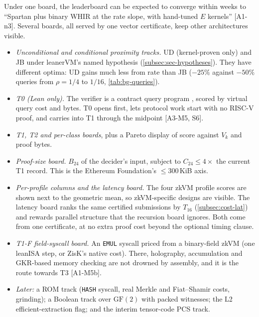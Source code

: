 Under one board, the leaderboard can be expected to converge within weeks to \enquote{Spartan plus
binary WHIR at the rate slope, with hand-tuned $E$ kernels} [A1-n3]. Several boards, all served by one
vector certificate, keep other architectures visible.
\begin{itemize}[nosep]
\item \emph{Unconditional and conditional proximity tracks.} UD (kernel-proven only) and JB under
  leanerVM's named  hypothesis (\cref{subsec:sec-hypotheses}). They have different
  optima: UD gains much less from rate than JB ($-25\%$ against $-50\%$ queries from $\rho=1/4$ to
  $1/16$, \cref{tab:bg-queries}).
\item \emph{T0 (Lean only).} The verifier is a contract query program , scored by virtual
  query cost and bytes. T0 opens first, lets protocol work start with no RISC-V proof, and carries
  into T1 through the  midpoint [A3-M5, S6].
\item \emph{T1, T2 and per-class boards}, plus a Pareto display of score against $V_k$ and proof
  bytes.
\item \emph{Proof-size board.} $B_{24}$ of the decider's input, subject to $C_{24}\le4\times$ the
  current T1 record. This is the Ethereum Foundation's $\le300$\,KiB axis.
\item \emph{Per-profile columns and the latency board.} The four zkVM profile scores are shown next
  to the geometric mean, so zkVM-specific designs are visible. The latency board ranks the same
  certified submissions by $T_{16}$ (\cref{subsec:cost-lat}) and rewards parallel structure that the
  recursion board ignores. Both come from one certificate, at no extra proof cost beyond the optional
  timing clause.
\item \emph{T1-F field-syscall board.} An \texttt{EMUL} syscall priced from a binary-field zkVM
  (one leanISA step, or ZisK's native cost). There, holography, accumulation and GKR-based memory
  checking are not drowned by assembly, and it is the route towards T3 [A1-M5b].
\item \emph{Later:} a ROM track (\texttt{HASH} syscall, real Merkle and Fiat--Shamir costs,
  grinding); a Boolean track over $\mathrm{GF}(2)$ with packed witnesses; the L2 efficient-extraction
  flag; and the interim tensor-code PCS track.
\end{itemize}
